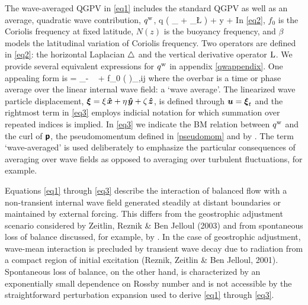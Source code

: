 \documentclass[12pt, oneside]{book}
\begin{document}
The wave-averaged QGPV in \eqref{eq1} includes the standard QGPV as well as an average, quadratic wave contribution, $q^{\mathrm{w}}$,
\beq
q  \Big( _{ \hlap} + _{ \L} \Big) \psiL + \beta y + \qdag \per
\label{eq2}
\eeq
In \eqref{eq2}, $f_0$ is the Coriolis frequency at fixed latitude, $N(z)$ is the buoyancy frequency, and $\beta$ models the latitudinal variation of Coriolis frequency.  Two operators are defined in \eqref{eq2}: the horizontal Laplacian $\triangle$ and the vertical derivative operator $\mathrm{L}$.
We provide several equivalent expressions for $q^{\mathrm{w}}$ in appendix \ref{qwappendix}.  One appealing form is
\beq
\qdag = _{-\bzh \,\bcdot \, \curl \,  \sbp} + \half f_0 \left ( \right )_{,ij}\com
\label{eq3}
\eeq
where the overbar is a time or phase average over the linear internal wave field: a `wave average'.  The linearized wave particle displacement, $\boldsymbol {\xi} = \xi \hspace{0.1em} \boldsymbol{\hat x} + \eta \hspace{0.1em}\boldsymbol{\hat y} + \zeta \hspace{0.1em}\boldsymbol{\hat z}$, is defined through $\boldsymbol u =\boldsymbol {\xi}_t$ and the rightmost term in \eqref{eq3} employs indicial notation for which summation over repeated indices is implied.  In \eqref{eq3} we indicate the BM relation between $q^{\mathrm{w}}$ and the curl of $\boldsymbol{\mathsf{p}}$, the pseudomomentum defined in \eqref{pseudomom} and by \citet{AndrewsMcIntyre}.  The term `wave-averaged' is used deliberately to emphasize the particular consequences of averaging over wave fields as opposed to averaging over turbulent fluctuations, for example.

Equations \eqref{eq1} through \eqref{eq3} describe the interaction of balanced flow with a non-transient internal wave field generated steadily at distant boundaries or maintained by external forcing.  This differs from the geostrophic adjustment scenario considered by Zeitlin, Reznik \& Ben Jelloul (2003) \nocite{zeitlin2003} and from spontaneous loss of balance discussed, for example, by \citet{Vanneste2013}.  In the case of geostrophic adjustment, wave-mean interaction is precluded by transient wave decay due to radiation from a compact region of initial excitation (Reznik, Zeitlin \& Ben Jelloul, 2001). \nocite{reznik2001}  Spontaneous loss of balance, on the other hand, is characterized  by an exponentially small dependence on Rossby number and is not accessible by the straightforward perturbation expansion used to derive \eqref{eq1} through \eqref{eq3}.  
\end{document}
